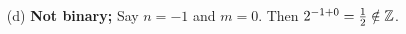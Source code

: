 \documentclass[../UNABRIDGEDalgebraNotesMSRI-UP2016.tex]{subfiles}
\begin{document}
\begin{frame}
\begin{itemize}
\item[(d)] \textbf{Not binary;} Say $n=-1$ and $m=0$.  Then $2^{-1+0}=
\frac{1}{2}\notin \mathbb Z$.

%

\end{itemize}
\end{frame}
\end{document}
